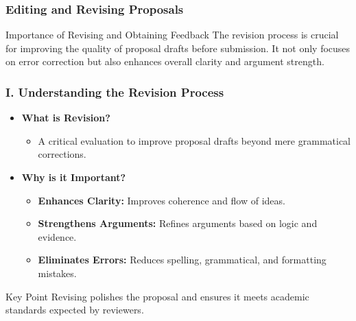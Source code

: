 \documentclass[aspectratio=169]{beamer}
\begin{document}
\begin{frame}[fragile]
    \frametitle{Editing and Revising Proposals}
    \begin{block}{Importance of Revising and Obtaining Feedback}
        The revision process is crucial for improving the quality of proposal drafts before submission. 
        It not only focuses on error correction but also enhances overall clarity and argument strength.
    \end{block}
\end{frame}

\begin{frame}[fragile]
    \frametitle{I. Understanding the Revision Process}
    \begin{itemize}
        \item \textbf{What is Revision?}
        \begin{itemize}
            \item A critical evaluation to improve proposal drafts beyond mere grammatical corrections.
        \end{itemize}
        
        \item \textbf{Why is it Important?}
        \begin{itemize}
            \item \textbf{Enhances Clarity:} Improves coherence and flow of ideas.
            \item \textbf{Strengthens Arguments:} Refines arguments based on logic and evidence.
            \item \textbf{Eliminates Errors:} Reduces spelling, grammatical, and formatting mistakes.
        \end{itemize}
    \end{itemize}
    \begin{block}{Key Point}
        Revising polishes the proposal and ensures it meets academic standards expected by reviewers.
    \end{block}
\end{frame}
\end{document}
